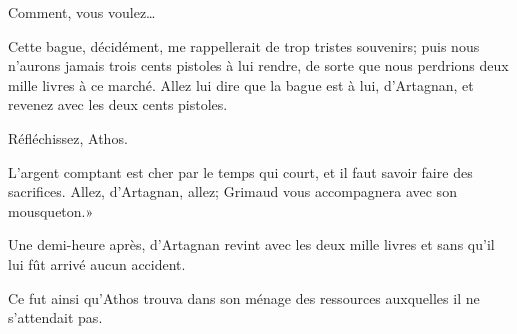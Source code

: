 \speak  Comment, vous voulez\dots 

\speak  Cette bague, décidément, me rappellerait de trop tristes souvenirs; puis nous n'aurons jamais trois cents pistoles à lui rendre, de sorte que nous perdrions deux mille livres à ce marché. Allez lui dire que la bague est à lui, d'Artagnan, et revenez avec les deux cents pistoles. 

\speak  Réfléchissez, Athos. 

\speak  L'argent comptant est cher par le temps qui court, et il faut savoir faire des sacrifices. Allez, d'Artagnan, allez; Grimaud vous accompagnera avec son mousqueton.» 

Une demi-heure après, d'Artagnan revint avec les deux mille livres et sans qu'il lui fût arrivé aucun accident. 

Ce fut ainsi qu'Athos trouva dans son ménage des ressources auxquelles il ne s'attendait pas.